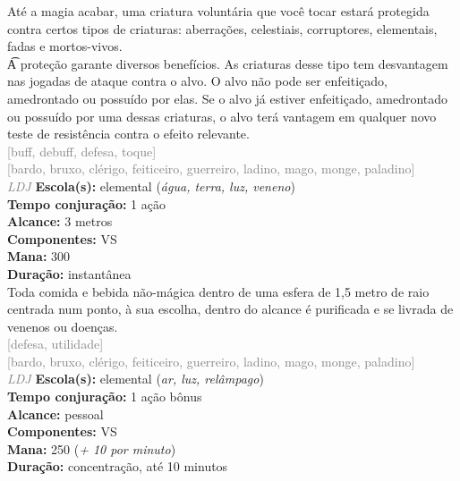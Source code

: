 \documentclass{RPG_Adventure}[2021/10/20]
\begin{document}
{\normalsize Até a magia acabar, uma criatura voluntária que você tocar estará protegida contra certos tipos de criaturas: aberrações, celestiais, corruptores, elementais, fadas e mortos-vivos.\\\t A proteção garante diversos benefícios. As criaturas desse tipo tem desvantagem nas jogadas de ataque contra o alvo. O alvo não pode ser enfeitiçado, amedrontado ou possuído por elas. Se o alvo já estiver enfeitiçado, amedrontado ou possuído por uma dessas criaturas, o alvo terá vantagem em qualquer novo teste de resistência contra o efeito relevante.\\}
{\scriptsize \textcolor{gray}{[buff, debuff, defesa, toque]\\}}
{\scriptsize \textcolor{gray}{[bardo, bruxo, clérigo, feiticeiro, guerreiro, ladino, mago, monge, paladino]\\}}
{\tiny \textcolor{gray}{\textit{LDJ}}}
{\small \t \textbf{Escola(s):} elemental (\textit{água, terra, luz, veneno})\\\t \textbf{Tempo conjuração:} 1 ação\\\t \textbf{Alcance:} 3 metros\\\t \textbf{Componentes:} VS\\\t \textbf{Mana:} 300\\\t \textbf{Duração:} instantânea\\}
{\normalsize Toda comida e bebida não-mágica dentro de uma esfera de 1,5 metro de raio centrada num ponto, à sua escolha, dentro do alcance é purificada e se livrada de venenos ou doenças.\\}
{\scriptsize \textcolor{gray}{[defesa, utilidade]\\}}
{\scriptsize \textcolor{gray}{[bardo, bruxo, clérigo, feiticeiro, guerreiro, ladino, mago, monge, paladino]\\}}
{\tiny \textcolor{gray}{\textit{LDJ}}}
{\small \t \textbf{Escola(s):} elemental (\textit{ar, luz, relâmpago})\\\t \textbf{Tempo conjuração:} 1 ação bônus\\\t \textbf{Alcance:} pessoal\\\t \textbf{Componentes:} VS\\\t \textbf{Mana:} 250 (\textit{+ 10 por minuto})\\\t \textbf{Duração:} concentração, até 10 minutos\\}
\end{document}
